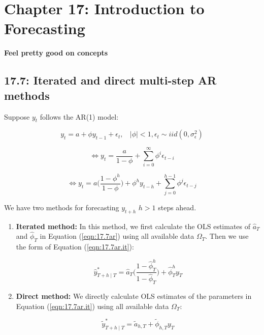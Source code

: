 %
%
%
%
%
%

\section{Chapter 17: Introduction to Forecasting}

\textbf{Feel pretty good on concepts}

\subsection{17.7: Iterated and direct multi-step AR methods}

Suppose \(y_t\) follows the AR(1) model: 

\begin{equation} \label{eqn:17.7ar}
y_t = a + \phi y_{t-1} + \epsilon_t, \ \ \ \ |\phi| < 1, \epsilon_t \sim iid(0, \sigma_\epsilon^2)
\end{equation}

\[
\iff y_t =  \frac{a}{1 - \phi} + \sum_{i=0}^\infty \phi^i \epsilon_{t-i}
\]

\begin{equation} \label{eqn:17.7ar.it}
\iff y_t = a \bigg( \frac{1 - \phi^h}{1 - \phi} \bigg) + \phi^h y_{t-h} + \sum_{j=0}^{h-1} \phi^j \epsilon_{t-j}
\end{equation}

We have two methods for forecasting \(y_{t+h}\) \(h >1\) steps ahead.

\begin{enumerate}[(1)]

\item \textbf{Iterated method:} In this method, we first calculate the OLS estimates of \(\hat{a}_T\) and \(\hat{\phi}_T\) in Equation (\ref{eqn:17.7ar}) using all available data \(\Omega_T\). Then we use the form of Equation (\ref{eqn:17.7ar.it}):

\[
\hat{y}_{T+h \mid T}^* = \hat{a}_T \bigg( \frac{1 - \hat{\phi}_T^h}{1 - \hat{\phi}_T} \bigg) + \hat{\phi}_T^h y_{T} 
\] 

\item \textbf{Direct method:} We directly calculate OLS estimates of the parameters in Equation (\ref{eqn:17.7ar.it}) using all available data \(\Omega_T\):

\[
\tilde{y}_{T+h \mid T}^* = \tilde{a}_{h,T} + \tilde{\phi}_{h,T} y_{T} 
\] 

\end{enumerate}

